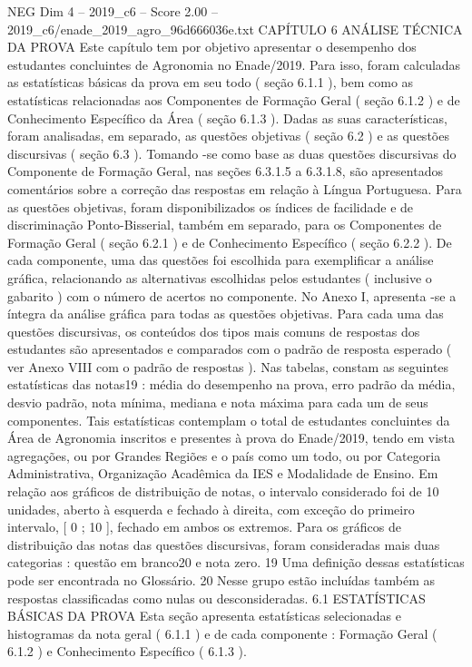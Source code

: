 \begin{textsample}{NEG Dim 4 – 2019\_c6 – Score 2.00 – 2019\_c6/enade\_2019\_agro\_96d666036e.txt}  \label{ex:f4_neg_266}
CAPÍTULO 6 ANÁLISE TÉCNICA DA PROVA Este capítulo tem por objetivo apresentar o desempenho dos estudantes concluintes de Agronomia no Enade/2019.
Para isso, foram calculadas as estatísticas básicas da prova em seu todo ( seção 6.1.1 ), bem como as estatísticas relacionadas aos Componentes de Formação Geral ( seção 6.1.2 ) e de Conhecimento Específico da Área ( seção 6.1.3 ).
Dadas as suas características, foram analisadas, em separado, as questões objetivas ( seção 6.2 ) e as questões discursivas ( seção 6.3 ).
Tomando -se como base as duas questões discursivas do Componente de Formação Geral, nas seções 6.3.1.5 a 6.3.1.8, são apresentados comentários sobre a correção das respostas em relação à Língua Portuguesa.
Para as questões objetivas, foram disponibilizados os índices de facilidade e de discriminação Ponto-Bisserial, também em separado, para os Componentes de Formação Geral ( seção 6.2.1 ) e de Conhecimento Específico ( seção 6.2.2 ).
De cada componente, uma das questões foi escolhida para exemplificar a análise gráfica, relacionando as alternativas escolhidas pelos estudantes ( inclusive o gabarito ) com o número de acertos no componente.
No Anexo I, apresenta -se a íntegra da análise gráfica para todas as questões objetivas.
Para cada uma das questões discursivas, os conteúdos dos tipos mais comuns de respostas dos estudantes são apresentados e comparados com o padrão de resposta esperado ( ver Anexo VIII com o padrão de respostas ).
Nas tabelas, constam as seguintes estatísticas das notas19 : média do desempenho na prova, erro padrão da média, desvio padrão, nota mínima, mediana e nota máxima para cada um de seus componentes.
Tais estatísticas contemplam o total de estudantes concluintes da Área de Agronomia inscritos e presentes à prova do Enade/2019, tendo em vista agregações, ou por Grandes Regiões e o país como um todo, ou por Categoria Administrativa, Organização Acadêmica da IES e Modalidade de Ensino.
Em relação aos gráficos de distribuição de notas, o intervalo considerado foi de 10 unidades, aberto à esquerda e fechado à direita, com exceção do primeiro intervalo, [ 0 ; 10 ], fechado em ambos os extremos.
Para os gráficos de distribuição das notas das questões discursivas, foram consideradas mais duas categorias : questão em branco20 e nota zero. 19 Uma definição dessas estatísticas pode ser encontrada no Glossário. 20 Nesse grupo estão incluídas também as respostas classificadas como nulas ou desconsideradas. 6.1 ESTATÍSTICAS BÁSICAS DA PROVA Esta seção apresenta estatísticas selecionadas e histogramas da nota geral ( 6.1.1 ) e de cada componente : Formação Geral ( 6.1.2 ) e Conhecimento Específico ( 6.1.3 ).

\end{textsample}
